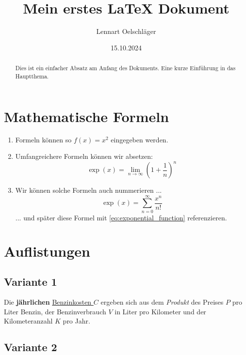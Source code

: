 \documentclass{article}
\title{Mein erstes LaTeX Dokument}
\author{Lennart Oelschläger}
\date{15.10.2024}
\begin{document}
\maketitle

\begin{abstract}
    Dies ist ein einfacher Absatz am Anfang des Dokuments. Eine kurze Einführung in das Hauptthema.
\end{abstract}

\tableofcontents

\newpage

\section{Mathematische Formeln}

\begin{enumerate}
    \item Formeln können so $f(x) = x^2$ eingegeben werden. 
    \item Umfangreichere Formeln können wir absetzen:
    $$ \exp(x) =  \lim_{n \to \infty} \left( 1 + \frac{1}{n} \right)^n $$
    \item Wir können solche Formeln auch nummerieren ...
    \begin{equation}
        \label{eq:exponential_function}
        \exp(x) = \sum_{n = 0}^\infty \frac{x^n}{n!}
    \end{equation}
    ... und später diese Formel mit \eqref{eq:exponential_function} referenzieren.
\end{enumerate}

\section{Auflistungen}

\subsection{Variante 1}

Die \textbf{jährlichen} \underline{Benzinkosten $C$} ergeben sich aus dem \textit{Produkt} des Preises $P$ pro Liter Benzin, der Benzinverbrauch $V$ in Liter pro Kilometer und der Kilometeranzahl $K$ pro Jahr.

\subsection{Variante 2}
\end{document}
